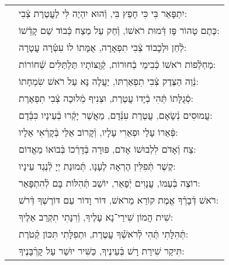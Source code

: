 \documentclass[twoside, openany, parskip=half, 11pt]{book}
\begin{document}
\begin{footnotesize}
\begin{longtable}{l p{}}
		\kahal &
		יִתְפָּאֵר בִּי כִּי חָפֵץ בִּי, וְֿהוּא יִהְיֶה לִּי לַעֲטֶרֶת צְֿבִי: \\
		
		\chazzan &
		כֶּתֶם טָהוֹר פָּז דְּֿמוּת רֹאשׁוֹ, וְֿחַק עַל מֵצַח כְּֿבוֹד שֵׁם קָדְֿשׁוֹ: \\
		
		\kahal &
		לְֿחֵן וּלְכָבוֹד צְֿבִי תִפְאָרָה, אֻמָּתוֹ לוֹ עִטְּֿֿרָה עֲטָרָה: \\
		
		\chazzan &
		מַחְלְֿפוֹת רֹאשׁוֹ כְּֿבִימֵי בְֿחוּרוֹת, קְֿוֻצּוֹתָיו תַּלְתַּלִּים שְֿׁחוֹרוֹת: \\
		
		\kahal &
		נְֿוֵה הַצֶּדֶק צְֿבִי תִפְאַרְתּוֹ, יַעֲלֶה נָּא עַל רֹאשׁ שִׂמְחָתוֹ: \\
		
		\chazzan &
		סְֿגֻלָּתוֹ תְּֿהִי בְֿיָדוֹ עֲטֶרֶת, וּצְנִיף מְֿלוּכָה צְֿבִי תִפְאֶרֶת: \\
		
		\kahal &
		עֲמוּסִים נְֿשָׂאָם, עֲטֶרֶת עִנְּֿֿדָם, מֵאֲשֶׁר יָקְֿרוּ בְֿעֵינָיו כִּבְּֿֿדָם: \\
		
		\chazzan &
		פְּֿאֵרוֹ עָלַי וּפְאֵרִי עָלָיו, וְֿקָרוֹב אֵלַי בְּֿקָרְֿאִי אֵלָיו: \\
		
		\kahal &
		צַח וְֿאָדֹם לִלְבוּשׁוֹ אָדֹם, פּוּרָה בְּֿדָרְֿכוֹ בְּֿבוֹאוֹ מֵאֱדוֹם: \\
		
		\chazzan &
		קֶשֶׁר תְּֿפִלִּין הֶרְאָה לֶעָנָו, תְּֿמוּנַת יְיָ לְֿנֶגֶד עֵינָיו: \\
		
		\kahal &
		רוֹצֶה בְֿעַמּוֹ, עֲנָוִים יְֿפָאֵר, יוֹשֵׁב תְּֿהִלּוֹת בָּם לְֿהִתְפָּאֵר: \\
		
		\chazzan &
		רֹאשׁ דְּֿבָרְֿךָ אֱמֶת קוֹרֵא מֵרֹאשׁ, דּוֹר וָדוֹר עַם דּוֹרֶשְׁךָ דְּֿרֹשׁ: \\
		
		\kahal &
		שִׁית הֲמוֹן שִׁירַי־נָא עָלֶיךָ, וְֿרִנָּתִי תִקְרַב אֵלֶיךָ: \\
		
		\chazzan &
		תְּֿהִלָּתִי תְּֿהִי לְֿרֹאשְֿֿׁךָ עֲטֶרֶת, וּתְפִלָּתִי תִּכּוֹן קְֿטֹרֶת: \\
		
		\kahal &
		תִּיקַר שִׁירַת רָשׁ בְּֿעֵינֶיךָ, כַּשִּׁיר יוּשַׁר עַל קָרְֿבָּנֶיךָ: \\
		

\end{longtable}
\end{footnotesize}
\end{document}
